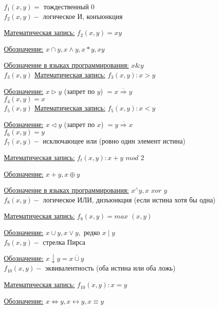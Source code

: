 \documentclass[a4paper, 12pt] {article}
\begin{document}
$ f_{1}(x, y)= $ тождественный $ 0 $\\

$ f_{2}(x, y)- $ логическое И, конъюнкция

\underline{Математическая запись:} $ f_{2}(x, y)=xy $

\underline{Обозначение:} $ x \cap y, x \wedge y, x*y, xy $

\underline{Обозначение в языках программирования:} $ x \& y $\\

$ f_{3}(x, y) $
\underline{Математическая запись:} $  f_{3}(x, y): x>y $

\underline{Обозначение:} $ x \rhd y$ (запрет по $ y $) $ = \overline{x \Rightarrow y} $\\

$ f_{4}(x, y)=x $\\

$ f_{5}(x, y) $
\underline{Математическая запись:} $  f_{5}(x, y): x<y $

\underline{Обозначение:} $ x \lhd y$ (запрет по $ x $) $ = \overline{y \Rightarrow x} $\\

$ f_{6}(x, y)=y $\\

$ f_{7}(x, y)- $ исключающее или (ровно один элемент истина)

\underline{Математическая запись:} $  f_{t}(x, y) : x + y$  $ mod$  $ 2$

\underline{Обозначение:} $ x + y, x \oplus y $

\underline{Обозначение в языках программирования:} $ x^\wedge y, x $  $xor  $ $ y  $\\

$ f_{8}(x, y)- $ логическое ИЛИ, дизъюнкция (если истина хотя бы одна)

\underline{Математическая запись:} $  f_{8}(x, y) = max$  $ (x, y)$

\underline{Обозначение:} $ x \cup y, x \vee y, $ редко $ x \mid y $\\

$ f_{9}(x, y) - $ стрелка Пирса

\underline{Обозначение:} $ x \downarrow y = \overline{x \cup y}$\\

$ f_{10}(x, y)- $ эквивалентность (оба истина или оба ложь)

\underline{Математическая запись:} $  f_{10}(x, y) : x=y$

\underline{Обозначение:} $ x \Leftrightarrow y, x \leftrightarrow y, x \equiv y $
\end{document}

